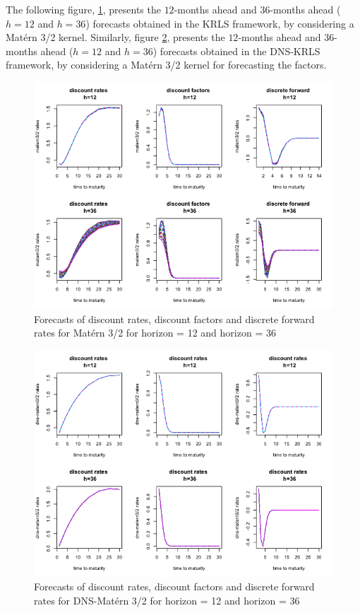 \begin{table}[!htb]
The following figure, \ref{fcast_matern32}, presents the $12$-months ahead and $36$-months ahead ($h = 12$ and $h = 36$) forecasts obtained in the KRLS framework, by considering a Mat\'ern 3/2 kernel. Similarly, figure \ref{fcast_ns_matern32}, presents the $12$-months ahead and $36$-months ahead ($h = 12$ and $h = 36$) forecasts obtained in the DNS-KRLS framework, by considering a Mat\'ern 3/2 kernel for forecasting the factors. 

\begin{figure}[!htb]
\centering
\includegraphics[width=12.5cm]{gfx/chapter-krls-models/fcast_matern32}
\caption{Forecasts of discount rates, discount factors and discrete forward rates for Mat\'ern 3/2 for horizon = 12 and horizon = 36}
\label{fcast_matern32}
\end{figure}

\begin{figure}[!htb]
\centering
\includegraphics[width=12.5cm]{gfx/chapter-krls-models/fcast_ns_matern32}
\caption{Forecasts of discount rates, discount factors and discrete forward rates for DNS-Mat\'ern 3/2 for horizon = 12 and horizon = 36}
\label{fcast_ns_matern32}
\end{figure}


\end{table}
